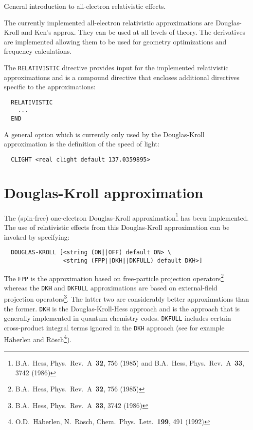 \label{sec:rel}

General introduction to all-electron relativistic effects.

The currently implemented all-electron relativistic approximations are Douglas-Kroll and Ken's approx. They can be used at all levels of theory. The derivatives are implemented allowing them to be used for geometry optimizations and frequency calculations.

The \verb+RELATIVISTIC+ directive provides input for the implemented relativistic 
approximations and is a compound directive that encloses additional directives 
specific to the approximations:

\begin{verbatim}
  RELATIVISTIC
    ...
  END
\end{verbatim}

A general option which is currently only used by the Douglas-Kroll 
approximation is the definition of the speed of light:

\begin{verbatim}
  CLIGHT <real clight default 137.0359895>
\end{verbatim}

\section{Douglas-Kroll approximation}
\label{sec:douglas-kroll}

The (spin-free) one-electron Douglas-Kroll approximation\footnote{B.A.~Hess, 
Phys.~Rev.~A~{\bf 32}, 756 (1985) and B.A.~Hess, Phys.~Rev.~A~{\bf 33}, 3742 
(1986)} has been implemented. The use of relativistic effects from this 
Douglas-Kroll approximation can be invoked by 
specifying:

\begin{verbatim}
  DOUGLAS-KROLL [<string (ON||OFF) default ON> \
                 <string (FPP||DKH||DKFULL) default DKH>]

\end{verbatim}

The \verb+FPP+ is the approximation based on free-particle projection 
operators\footnote{B.A.~Hess, Phys.~Rev.~A~{\bf 32}, 756 (1985)} whereas the 
\verb+DKH+ and \verb+DKFULL+ approximations are based on external-field 
projection operators\footnote{B.A.~Hess, Phys.~Rev.~A~{\bf 33}, 3742 (1986)}.
The latter two are considerably better approximations than the former. \verb+DKH+ 
is the Douglas-Kroll-Hess approach and is the approach that is generally 
implemented in quantum chemistry codes. \verb+DKFULL+ includes certain 
cross-product integral terms ignored in the \verb+DKH+ approach (see for example 
H\"{a}berlen and R\"{o}sch\footnote{O.D.~H\"{a}berlen, N.~R\"{o}sch, 
Chem.~Phys.~Lett.~{\bf 199}, 491 (1992)}).

